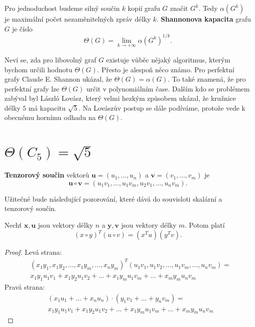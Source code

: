 Pro jednoduchost budeme silný součin $k$ kopií grafu $G$ značit $G^k$. Tedy $\alpha(G^k)$ je maximální počet nezaměnitelných zpráv délky $k$. \textbf{Shannonova kapacita} grafu $G$ je číslo
$$
    \Theta(G) = \lim_{k \rightarrow +\infty} \alpha(G^k)^{1/k}.
$$

Neví se, zda pro libovolný graf $G$ existuje vůběc nějaký algoritmus, kterým bychom určili hodnotu $\Theta(G)$. Přesto je alespoň něco známo. Pro perfektní grafy Claude E. Shannon ukázal, že $\Theta(G) = \alpha(G)$. To také znamená, že pro perfektní grafy lze $\Theta(G)$ určit v polynomiálním čase. Dalším kdo se problémem zabýval byl László Lovász, který velmi hezkým způsobem ukázal, že kružnice délky $5$ má kapacitu $\sqrt{5}$. Na Lovászův postup se dále podíváme, protože vede k obecnému hornímu odhadu na $\Theta(G)$.

\section{$\Theta(C_5) = \sqrt{5}$}

\textbf{Tenzorový součin} vektorů $\mathbf{u} = \left(u_1, \dots, u_n \right)$ a $\mathbf{v} = \left(v_1, \dots, v_m \right)$ je
$$
    \mathbf{u} \circ \mathbf{v} = \left( u_1 v_1, \dots, u_1 v_m, u_2 v_1, \dots, u_n v_m \right).
$$

Užitečné bude následující pozorování, které dává do souvisloti skalární a tenzorový součin.

\begin{pz}
    Nechť $\mathbf{x}, \mathbf{u}$ jsou vektory délky $n$ a $\mathbf{y}, \mathbf{v}$ jsou vektory délky $m$. Potom platí
    \begin{equation}
        \left( x \circ y \right)^T \left( u \circ v \right) = \left( x^T u \right) \left( y^T v \right).
        \label{eq:tensor_scalar_product}
    \end{equation}
\end{pz}

\begin{proof}
    Levá strana:
    \begin{equation*}
        \begin{split}
        & \left(x_1 y_1, x_1 y_2, \dots, x_1 y_m, \dots, x_n y_m \right)^T \left( u_1 v_1, u_1 v_2, \dots, u_1 v_m, \dots, u_n v_m \right) = \\
        & x_1 y_1 u_1 v_1 + x_1 y_2 u_1 v_2 + \dots + x_1 y_m u_1 v_m + \dots + x_m y_m u_n v_m
        \end{split}
    \end{equation*}
    Pravá strana:
    \begin{equation*}
        \begin{split}
            & \left( x_1 u_1 + \dots + x_n u_n \right) \cdot \left( y_1 v_1 + \dots + y_n v_m \right) = \\
            & x_1 y_1 u_1 v_1 + x_1 y_2 u_1 v_2 + \dots + x_1 y_m u_1 v_m + \dots + x_m y_m u_n v_m
        \end{split}
    \end{equation*}
\end{proof}

